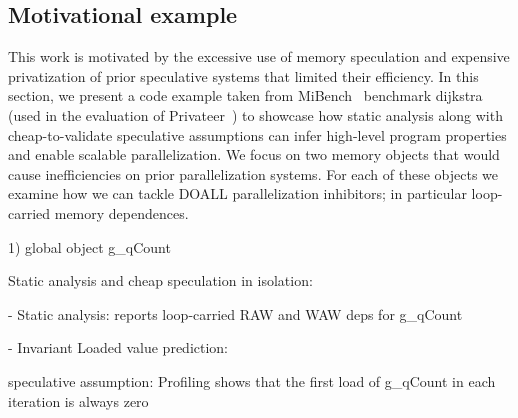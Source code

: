 \subsection{Motivational example}

This work is motivated by the excessive use of memory speculation and expensive
privatization of prior speculative systems that limited their efficiency.
%
In this section, we present a code example taken from MiBench~\cite{} benchmark
dijkstra (used in the evaluation of Privateer~\cite{}) to showcase how static
analysis along with cheap-to-validate speculative assumptions can infer
high-level program properties and enable scalable parallelization.
%
We focus on two memory objects that would cause inefficiencies on prior
parallelization systems.
%
For each of these objects we examine how we can tackle DOALL parallelization
inhibitors; in particular loop-carried memory dependences.

\lstset{basicstyle=\ttfamily, numbers=left, numberstyle=\tiny,
  stepnumber=1, numbersep=5pt}
\begin{figure}[t]
  \centering
  \scriptsize
  \subfloat[dijkstra]
  {
    \label{fig:dijkstra}
    \begin{minipage}{7.5cm}
      
    \end{minipage}
  }
\end{figure}




1) global object g\_qCount

Static analysis and cheap speculation in isolation:

- Static analysis: reports loop-carried RAW and WAW deps for g\_qCount

- Invariant Loaded value prediction:

speculative assumption: Profiling shows that the first load of g\_qCount in
  each iteration is always zero

